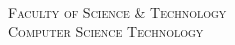 
\noindent %
\begin{minipage}{.40\textwidth}
	{\color{darkred} \faSchool} { \textsc{\college}}{ } {\color{darkred} \faSchool}\\ 
	\small\textsc{ Faculty of Science \& Technology}\\%
	\small\textsc{Computer Science Technology}
\end{minipage}%
\hfill	
\begin{minipage}{0.60\textwidth}%
	\raggedleft%
	{\Large \textsc{\doctitle}\par}
	\doublerule 
\end{minipage}%
\vspace{0.9cm}
{
	\centering
	\vspace{.2cm}
	\customhrule{0.5pt}
	{\scshape 
		\Large \coursenumber { } \coursetitle {}
		 \\
		\small\textsc{\semester}\par}
	\vspace{.3cm}
}